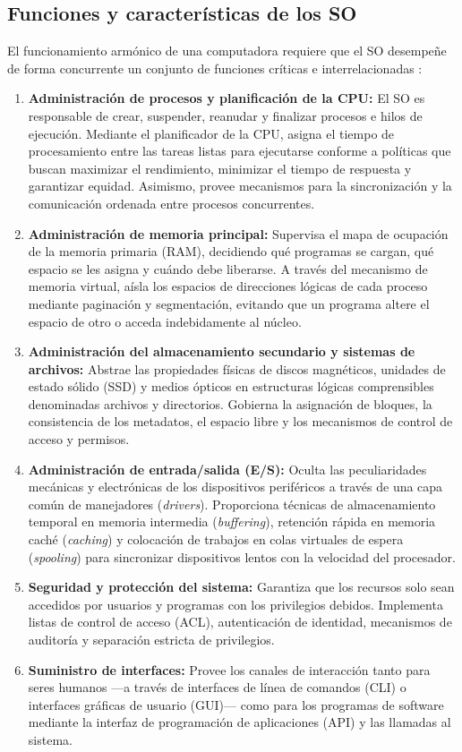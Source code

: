 \documentclass[12pt]{article}
\begin{document}
\subsection{Funciones y características de los SO}\label{sec:funcionesCaracteristicasSo}

El funcionamiento armónico de una computadora requiere que el SO desempeñe de forma concurrente un conjunto de funciones críticas e interrelacionadas \parencite[\S 2.1, p.\ 70]{stallings2018operating}:

\begin{enumerate}[leftmargin=*]
    \item \textbf{Administración de procesos y planificación de la CPU:} El SO es responsable de crear, suspender, reanudar y finalizar procesos e hilos de ejecución. Mediante el planificador de la CPU, asigna el tiempo de procesamiento entre las tareas listas para ejecutarse conforme a políticas que buscan maximizar el rendimiento, minimizar el tiempo de respuesta y garantizar equidad. Asimismo, provee mecanismos para la sincronización y la comunicación ordenada entre procesos concurrentes.
    \item \textbf{Administración de memoria principal:} Supervisa el mapa de ocupación de la memoria primaria (RAM), decidiendo qué programas se cargan, qué espacio se les asigna y cuándo debe liberarse. A través del mecanismo de memoria virtual, aísla los espacios de direcciones lógicas de cada proceso mediante paginación y segmentación, evitando que un programa altere el espacio de otro o acceda indebidamente al núcleo.
    \item \textbf{Administración del almacenamiento secundario y sistemas de archivos:} Abstrae las propiedades físicas de discos magnéticos, unidades de estado sólido (SSD) y medios ópticos en estructuras lógicas comprensibles denominadas archivos y directorios. Gobierna la asignación de bloques, la consistencia de los metadatos, el espacio libre y los mecanismos de control de acceso y permisos.
    \item \textbf{Administración de entrada/salida (E/S):} Oculta las peculiaridades mecánicas y electrónicas de los dispositivos periféricos a través de una capa común de manejadores (\textit{drivers}). Proporciona técnicas de almacenamiento temporal en memoria intermedia (\textit{buffering}), retención rápida en memoria caché (\textit{caching}) y colocación de trabajos en colas virtuales de espera (\textit{spooling}) para sincronizar dispositivos lentos con la velocidad del procesador.
    \item \textbf{Seguridad y protección del sistema:} Garantiza que los recursos solo sean accedidos por usuarios y programas con los privilegios debidos. Implementa listas de control de acceso (ACL), autenticación de identidad, mecanismos de auditoría y separación estricta de privilegios.
    \item \textbf{Suministro de interfaces:} Provee los canales de interacción tanto para seres humanos —a través de interfaces de línea de comandos (CLI) o interfaces gráficas de usuario (GUI)— como para los programas de software mediante la interfaz de programación de aplicaciones (API) y las llamadas al sistema.
\end{enumerate}
\end{document}
